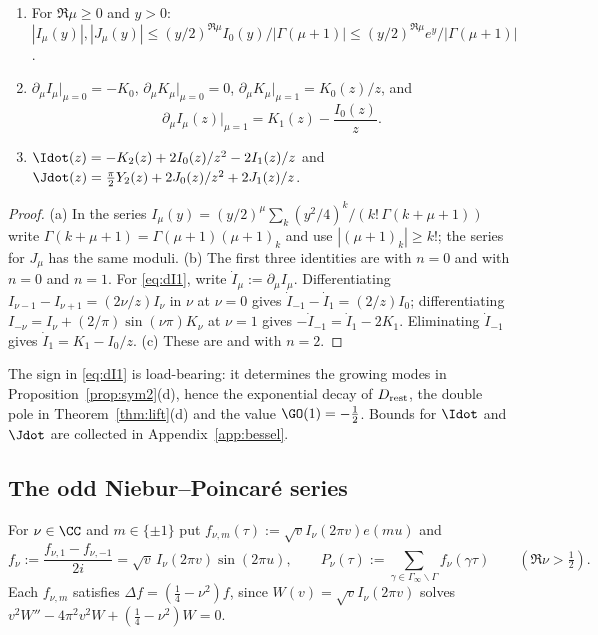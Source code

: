 \begin{lemma}\label{lem:bessel-basic}
\begin{enumerate}[label=\textup{(\alph*)}]
\item For $\Re\mu\ge0$ and $y>0$: $|I_\mu(y)|,|J_\mu(y)|\le(y/2)^{\Re\mu}I_0(y)/|\Gamma(\mu+1)|\le(y/2)^{\Re\mu}e^y/|\Gamma(\mu+1)|$.
\item $\partial_\mu I_\mu|_{\mu=0}=-K_0$, $\partial_\mu K_\mu|_{\mu=0}=0$, $\partial_\mu K_\mu|_{\mu=1}=K_0(z)/z$, and
\begin{equation}\label{eq:dI1}
\partial_\mu I_\mu(z)\big|_{\mu=1}=K_1(z)-\frac{I_0(z)}z .
\end{equation}
\item $\Idot(z)=-K_2(z)+2I_0(z)/z^2-2I_1(z)/z$ and $\Jdot(z)=\frac\pi2Y_2(z)+2J_0(z)/z^2+2J_1(z)/z$.
\end{enumerate}
\end{lemma}

\begin{proof}
(a) In the series $I_\mu(y)=(y/2)^\mu\sum_k(y^2/4)^k/(k!\,\Gamma(k+\mu+1))$ write $\Gamma(k+\mu+1)=\Gamma(\mu+1)(\mu+1)_k$ and use
$|(\mu+1)_k|\ge k!$; the series for $J_\mu$ has the same moduli. (b) The first three identities are \cite[10.38.3]{DLMF} with $n=0$ and \cite[10.38.4]{DLMF} with $n=0$ and $n=1$.
For \eqref{eq:dI1}, write $\dot I_\mu:=\partial_\mu I_\mu$. Differentiating $I_{\nu-1}-I_{\nu+1}=(2\nu/z)I_\nu$ in $\nu$ at $\nu=0$ gives
$\dot I_{-1}-\dot I_1=(2/z)I_0$; differentiating $I_{-\nu}=I_\nu+(2/\pi)\sin(\nu\pi)K_\nu$ at $\nu=1$ gives $-\dot I_{-1}=\dot I_1-2K_1$.
Eliminating $\dot I_{-1}$ gives $\dot I_1=K_1-I_0/z$. (c) These are \cite[10.38.3]{DLMF} and \cite[10.15.3]{DLMF} with $n=2$.
\end{proof}

The sign in \eqref{eq:dI1} is load-bearing: it determines the growing modes in Proposition~\ref{prop:sym2}(d), hence the exponential decay
of $D_{\rm rest}$, the double pole in Theorem~\ref{thm:lift}(d) and the value $\GO(1)=-\frac12$. Bounds for $\Idot$ and $\Jdot$ are collected in Appendix~\ref{app:bessel}.

\subsection{The odd Niebur--Poincar\'e series}

For $\nu\in\CC$ and $m\in\{\pm1\}$ put $f_{\nu,m}(\tau):=\sqrt vI_\nu(2\pi v)e(mu)$ and
\[
f_\nu:=\frac{f_{\nu,1}-f_{\nu,-1}}{2i}=\sqrt v\,I_\nu(2\pi v)\sin(2\pi u),\qquad
P_\nu(\tau):=\sum_{\gamma\in\Gamma_\infty\backslash\Gamma}f_\nu(\gamma\tau)\qquad(\Re\nu>\tfrac12).
\]
Each $f_{\nu,m}$ satisfies $\Delta f=(\frac14-\nu^2)f$, since $W(v)=\sqrt vI_\nu(2\pi v)$ solves $v^2W''-4\pi^2v^2W+(\frac14-\nu^2)W=0$.

